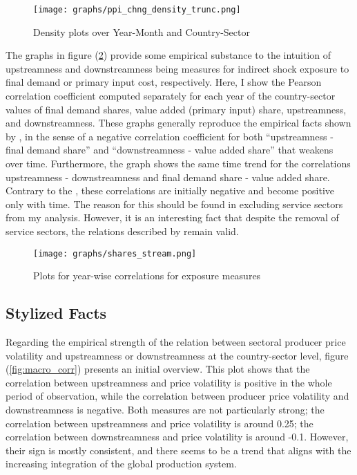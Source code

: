 \begin{figure}[H]
    \texttt{[image: graphs/ppi\_chng\_density\_trunc.png]}
    \caption{\label{fig:ppi_chng_density} Density plots over Year-Month and Country-Sector}
\end{figure}

The graphs in figure (\ref{fig:shares_stream}) provide some empirical substance to the intuition of upstreamness and downstreamness being 
measures for indirect shock exposure to final demand or primary input cost, respectively. Here, I show the Pearson correlation coefficient
computed separately for each year of the country-sector values of final demand shares, value added (primary input) share, upstreamness, 
and downstreamness. These graphs generally reproduce the empirical facts shown by \textcite{antras2018MeasurementUpstreamnessDownstreamness},
in the sense of a negative correlation coefficient for both ``upstreamness - final demand share'' and ``downstreamness - value added share''
that weakens over time. Furthermore, the graph shows the same time trend for the correlations upstreamness - downstreamness and final demand
share - value added share. Contrary to the \textcite{antras2018MeasurementUpstreamnessDownstreamness}, these correlations are initially 
negative and become positive only with time. The reason for this should be found in excluding service sectors from my analysis. However,
it is an interesting fact that despite the removal of service sectors, the relations described by 
\textcite{antras2018MeasurementUpstreamnessDownstreamness} remain valid.

\begin{figure}[H]
    \texttt{[image: graphs/shares\_stream.png]}
    \caption{\label{fig:shares_stream} Plots for year-wise correlations for exposure measures}
\end{figure}



\subsection{Stylized Facts}

Regarding the empirical strength of the relation between sectoral producer price volatility and upstreamness or downstreamness at the 
country-sector level, figure (\ref{fig:macro_corr}) presents an initial overview. This plot shows that the correlation between 
upstreamness and price volatility is positive in the whole period of observation, while the correlation between producer price volatility and 
downstreamness is negative. Both measures are not particularly strong; the correlation between upstreamness and price volatility is around 0.25;
the correlation between downstreamness and price volatility is around -0.1. However, their sign is mostly consistent, and there seems to be a 
trend that aligns with the increasing integration of the global production system. 

